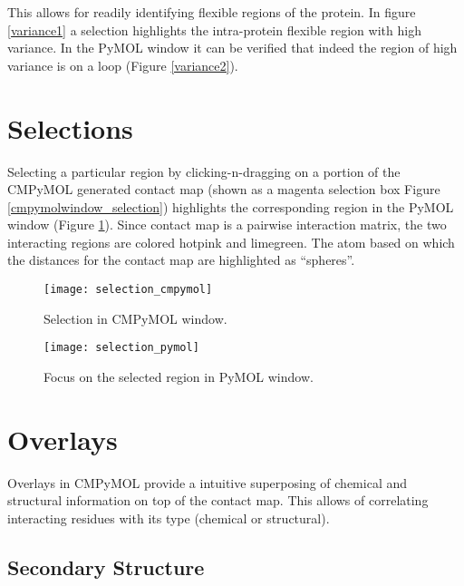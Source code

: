 \documentclass[11pt,fleqn]{book} %
\begin{document}
This allows for readily identifying flexible regions of the protein. In figure \ref{variance1} a selection highlights the intra-protein flexible region with high variance. In the PyMOL window it can be verified that indeed the region of high variance is on a loop (Figure \ref{variance2}).

\section{Selections}\label{selections}

Selecting a particular region by clicking-n-dragging on a portion of the CMPyMOL generated contact map (shown as a {\color{magenta} magenta} selection box Figure \ref{cmpymolwindow_selection}) highlights the corresponding region in the PyMOL window (Figure \ref{pymolwindow_selection}). Since contact map is a pairwise interaction matrix, the two interacting regions are colored {\color{hotpink} hotpink} and {\color{limegreen} limegreen}. The atom based on which the distances for the contact map are highlighted as ``spheres''.

\begin{figure}[ht!]
\centering
  \begin{minipage}[b]{0.45\textwidth}
  \centering
      \texttt{[image: selection\_cmpymol]}
      \caption{Selection in CMPyMOL window.}
  \label{cmpymolwindow_selection}
  \end{minipage}
  \quad
  \begin{minipage}[b]{0.45\textwidth}
  \centering
      \texttt{[image: selection\_pymol]}
      \caption{Focus on the selected region in PyMOL window.}
  \label{pymolwindow_selection}
  \end{minipage}
\end{figure}

\section{Overlays}

Overlays in CMPyMOL provide a intuitive superposing of chemical and structural information on top of the contact map. This allows of correlating interacting residues with its type (chemical or structural).

\subsection{Secondary Structure}\label{secondary_structure}
\end{document}
